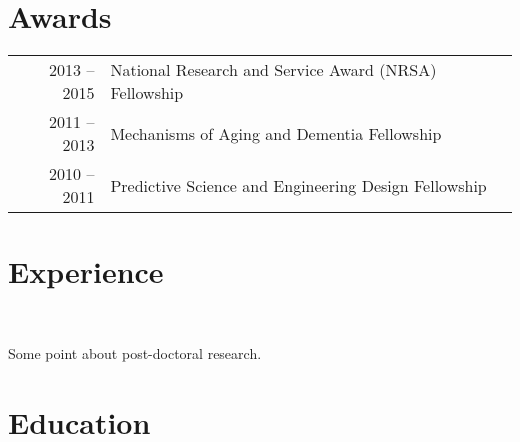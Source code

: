 \documentclass[]{winter-resume-openfont}
\begin{document}
\begin{minipage}[t]{0.65\textwidth}
\sectionsep





\section{Awards} 
\begin{tabular}{rll}
2013 – 2015	     &  National Research and Service Award (NRSA) Fellowship\\
2011 – 2013	     & Mechanisms of Aging and Dementia Fellowship\\
2010 – 2011	     & Predictive Science and Engineering Design Fellowship\\
\end{tabular}
\sectionsep

\section{Experience}
 \\
\begin{tightemize}
\item Some point about post-doctoral research.
\end{tightemize}

\sectionsep

\section{Education}
 \\


\end{minipage}
\end{document}
